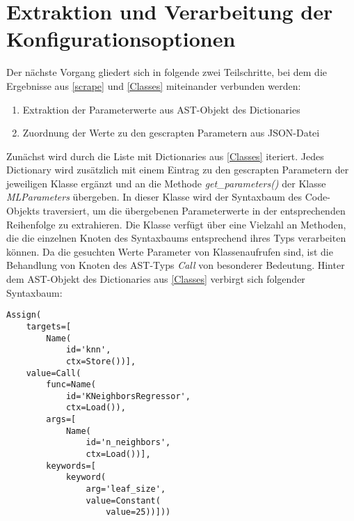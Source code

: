 \documentclass[german,bachelor]{swsLeipzig}
\begin{document}
\section{Extraktion und Verarbeitung der Konfigurationsoptionen} \label{Parameters}
Der nächste Vorgang gliedert sich in folgende zwei Teilschritte, bei dem die Ergebnisse aus \ref{scrape} und \ref{Classes} miteinander
verbunden werden:

\begin{enumerate}
 \item Extraktion der Parameterwerte aus AST-Objekt des Dictionaries
 \item Zuordnung der Werte zu den gescrapten Parametern aus JSON-Datei
\end{enumerate}

\noindent Zunächst wird durch die Liste mit Dictionaries aus \ref{Classes} iteriert.
Jedes Dictionary wird zusätzlich mit einem Eintrag zu den gescrapten Parametern der jeweiligen Klasse ergänzt und an die Methode \textit{get\_parameters()}
der Klasse \textit{MLParameters} übergeben.
In dieser Klasse wird der Syntaxbaum des Code-Objekts traversiert, um die übergebenen Parameterwerte in der
entsprechenden Reihenfolge zu extrahieren.
Die Klasse verfügt über eine Vielzahl an Methoden, die die einzelnen Knoten des Syntaxbaums entsprechend ihres Typs
verarbeiten können.
Da die gesuchten Werte Parameter von Klassenaufrufen sind, ist die Behandlung von Knoten des AST-Typs \textit{Call} von
besonderer Bedeutung.
Hinter dem AST-Objekt des Dictionaries aus \ref{Classes} verbirgt sich folgender Syntaxbaum: \\

\noindent\begin{minipage}{\linewidth}
\begin{lstlisting}[language=iPython, frame=single, label=class_dict, basicstyle=\small, caption={AST der KNeighborsRegressor-Klasse},captionpos=b]
Assign(
    targets=[
        Name(
            id='knn',
            ctx=Store())],
    value=Call(
        func=Name(
            id='KNeighborsRegressor',
            ctx=Load()),
        args=[
            Name(
                id='n_neighbors',
                ctx=Load())],
        keywords=[
            keyword(
                arg='leaf_size',
                value=Constant(
                    value=25))]))
\end{lstlisting}
\end{minipage}
\
\end{document}
